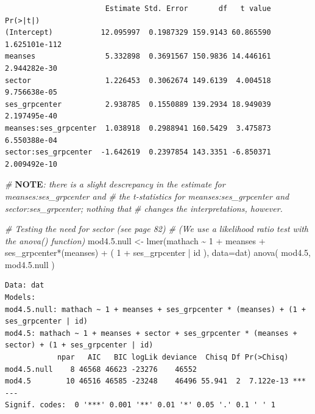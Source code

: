 \documentclass[
  letterpaper,
  DIV=11,
  numbers=noendperiod]{scrreprt}
\newenvironment{Shaded}{\begin{snugshade}}{\end{snugshade}}
\newcommand{\AlertTok}[1]{\textcolor[rgb]{1.00,0.00,0.00}{\textbf{#1}}}
\newcommand{\AttributeTok}[1]{\textcolor[rgb]{0.49,0.56,0.16}{#1}}
\newcommand{\CommentTok}[1]{\textcolor[rgb]{0.38,0.63,0.69}{\textit{#1}}}
\newcommand{\DecValTok}[1]{\textcolor[rgb]{0.25,0.63,0.44}{#1}}
\newcommand{\FloatTok}[1]{\textcolor[rgb]{0.25,0.63,0.44}{#1}}
\newcommand{\FunctionTok}[1]{\textcolor[rgb]{0.02,0.16,0.49}{#1}}
\newcommand{\NormalTok}[1]{\textcolor[rgb]{0.00,0.44,0.13}{#1}}
\newcommand{\OtherTok}[1]{\textcolor[rgb]{0.00,0.44,0.13}{#1}}
\newcommand{\SpecialCharTok}[1]{\textcolor[rgb]{0.25,0.44,0.63}{#1}}
\begin{document}
\begin{verbatim}
                       Estimate Std. Error       df   t value      Pr(>|t|)
(Intercept)           12.095997  0.1987329 159.9143 60.865590 1.625101e-112
meanses                5.332898  0.3691567 150.9836 14.446161  2.944282e-30
sector                 1.226453  0.3062674 149.6139  4.004518  9.756638e-05
ses_grpcenter          2.938785  0.1550889 139.2934 18.949039  2.197495e-40
meanses:ses_grpcenter  1.038918  0.2988941 160.5429  3.475873  6.550388e-04
sector:ses_grpcenter  -1.642619  0.2397854 143.3351 -6.850371  2.009492e-10
\end{verbatim}

\begin{Shaded}
\begin{Highlighting}[]
\CommentTok{\# }\AlertTok{NOTE}\CommentTok{: there is a slight descrepancy in the estimate for meanses:ses\_grpcenter and }
\CommentTok{\# the t{-}statistics for meanses:ses\_grpcenter and sector:ses\_grpcenter; nothing that }
\CommentTok{\# changes the interpretations, however.}


\CommentTok{\# Testing the need for sector  (see page 82)}
\CommentTok{\# (We use a likelihood ratio test with the anova() function)}
\NormalTok{mod4.}\FloatTok{5.}\NormalTok{null }\OtherTok{\textless{}{-}} \FunctionTok{lmer}\NormalTok{(mathach }\SpecialCharTok{\textasciitilde{}} \DecValTok{1} \SpecialCharTok{+}\NormalTok{ meanses }\SpecialCharTok{+}\NormalTok{ ses\_grpcenter}\SpecialCharTok{*}\NormalTok{(meanses) }\SpecialCharTok{+}\NormalTok{ ( }\DecValTok{1} \SpecialCharTok{+}\NormalTok{ ses\_grpcenter }\SpecialCharTok{|}\NormalTok{ id ), }\AttributeTok{data=}\NormalTok{dat)}
\FunctionTok{anova}\NormalTok{( mod4}\FloatTok{.5}\NormalTok{, mod4.}\FloatTok{5.}\NormalTok{null )}
\end{Highlighting}
\end{Shaded}

\begin{verbatim}
Data: dat
Models:
mod4.5.null: mathach ~ 1 + meanses + ses_grpcenter * (meanses) + (1 + ses_grpcenter | id)
mod4.5: mathach ~ 1 + meanses + sector + ses_grpcenter * (meanses + sector) + (1 + ses_grpcenter | id)
            npar   AIC   BIC logLik deviance  Chisq Df Pr(>Chisq)    
mod4.5.null    8 46568 46623 -23276    46552                         
mod4.5        10 46516 46585 -23248    46496 55.941  2  7.122e-13 ***
---
Signif. codes:  0 '***' 0.001 '**' 0.01 '*' 0.05 '.' 0.1 ' ' 1
\end{verbatim}
\end{document}
